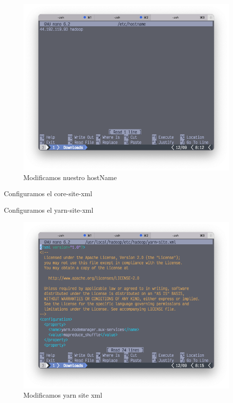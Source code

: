 \begin{figure}[h]
	\centering
	\includegraphics[scale=.35] {img/34-nano-etc-hostname}
	\caption{Modificamos nuestro hostName}
	\label{fig:34}	
\end{figure}
Configuramos el core-site-xml




Configuramos el yarn-site-xml

\begin{figure}[h]
	\centering
	\includegraphics[scale=.35] {img/36-yarn-site-xml}
	\caption{Modificamos yarn site xml}
	\label{fig:36}	
\end{figure}

